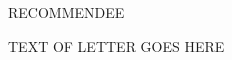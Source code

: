 \documentclass[11pt,recommendation,sign]{university_recommendation}
\begin{document}
\signature{MYNAME, Professor of MYFIELD\\\url{MY EMAIL ADDRESS}}

\begin{letter}{RECOMMENDEE}
\opening{}

TEXT OF LETTER GOES HERE

\closing{}
\end{letter}

		
\end{document}
